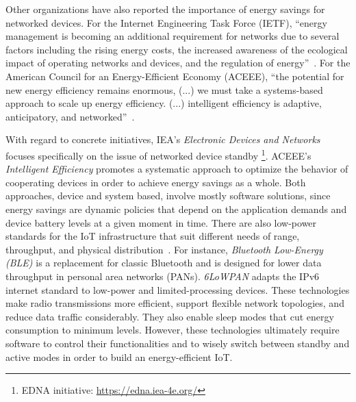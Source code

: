 \documentclass[12pt,english]{amsart}
\begin{document}
Other organizations have also reported the importance of energy savings for networked devices.
%
For the Internet Engineering Task Force (IETF), ``energy management is becoming an
additional requirement for networks due to several factors including the rising
energy costs, the increased awareness of the ecological
impact of operating networks and devices, and the regulation of
energy''~\cite{ietf.eman}.
%
For the American Council for an Energy-Efficient Economy (ACEEE),
``the potential for new energy efficiency remains enormous, (...) we must take
a systems-based approach to scale up energy efficiency.
(...) intelligent efficiency is adaptive, anticipatory, and networked''~\cite{aceee.1}.
%
%

With regard to concrete initiatives, IEA's \emph{Electronic Devices and Networks}
focuses specifically on the issue of networked device standby%
\footnote{EDNA initiative: \url{https://edna.iea-4e.org/}}.
ACEEE's \emph{Intelligent Efficiency} promotes a systematic approach
to optimize the behavior of cooperating devices in order to achieve energy
savings as a whole.
Both approaches, device and system based, involve mostly software solutions,
since energy savings are dynamic policies that depend on the application
demands and device battery levels at a given moment in time.
%
There are also low-power standards for the IoT
infrastructure that suit different needs of range, throughput, and physical
distribution~\cite{iot.energy.2}.
For instance, \emph{Bluetooth Low-Energy (BLE)} is a replacement for classic
Bluetooth and is designed for lower data throughput in personal area
networks (PANs).
\emph{6LoWPAN} adapts the IPv6 internet standard to low-power and
limited-processing devices.
%
These technologies make radio transmissions more efficient,
support flexible network topologies, and reduce data traffic considerably.
They also enable sleep modes that cut energy consumption to minimum levels.
%
However, these technologies ultimately require software to control their
functionalities and to wisely switch between standby and active modes in order
to build an energy-efficient IoT.
\end{document}
